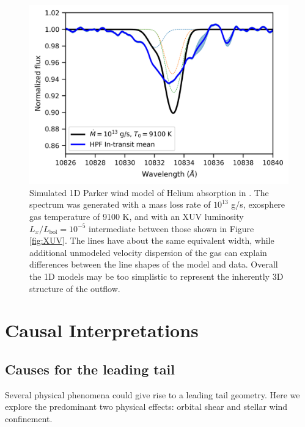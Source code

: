 \documentclass[twocolumn]{aastex631}
\newcommand{\hatpb}{\object{HAT-P-67 b}}
\begin{document}
\begin{figure}
    \includegraphics[width=\linewidth]{figures/pwinds_data_overlay.png}
    \caption{Simulated 1D Parker wind model of Helium absorption in \hatpb.  The spectrum was generated with a mass loss rate of $10^{13}$ g/s, exosphere gas temperature of 9100 K, and with an XUV luminosity $L_x/L_\mathrm{bol}=10^{-5}$ intermediate between those shown in Figure \ref{fig:XUV}.  The lines have about the same equivalent width, while additional unmodeled velocity dispersion of the gas can explain differences between the line shapes of the model and data.  Overall the 1D models may be too simplistic to represent the inherently 3D structure of the outflow.}
    \label{fig:pwinds}
\end{figure}


\section{Causal Interpretations} \label{secDiscuss}

\subsection{Causes for the leading tail} \label{secLeading}
Several physical phenomena could give rise to a leading tail geometry.  Here we explore the predominant two physical effects: orbital shear and stellar wind confinement.
\end{document}
